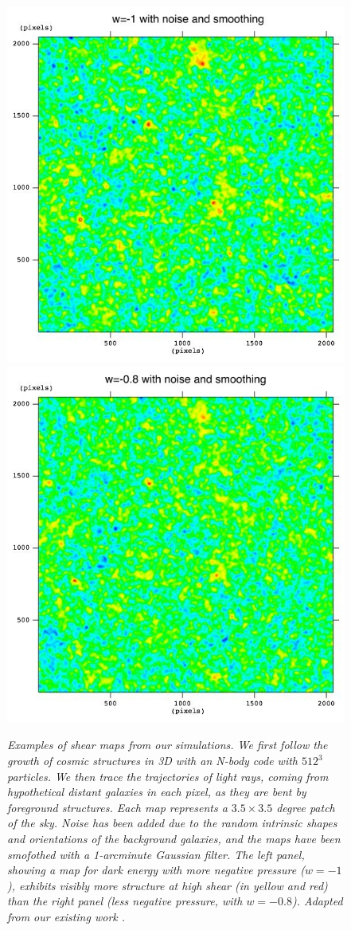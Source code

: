 \documentclass[10pt, preprint]{aastex}
\begin{document}
\begin{figure}[t]
\begin{center}
\includegraphics[width=8 cm]{fig1c.jpg} \includegraphics[width=8 cm]{fig1d.jpg}
\vspace{-1.5\baselineskip} \caption{\textit{Examples of shear maps
    from our simulations. We first follow the growth of cosmic
    structures in 3D with an N-body code with $512^3$ particles. We
    then trace the trajectories of light rays, coming from
    hypothetical distant galaxies in each pixel, as they are bent by
    foreground structures.  Each map represents a $3.5\times3.5$
    degree patch of the sky.  Noise has been added due to the random
    intrinsic shapes and orientations of the background galaxies, and
    the maps have been smofothed with a 1-arcminute Gaussian filter.
    The left panel, showing a map for dark energy with more negative
    pressure ($w=-1$), exhibits visibly more structure at high shear
    (in yellow and red) than the right panel (less negative pressure,
    with $w=-0.8$).  Adapted from our existing work \citep{KHM09}. }}
\end{center}
\vspace{-1\baselineskip}
\end{figure}
\end{document}
